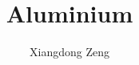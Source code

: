 \documentclass{beamer}
\title{Aluminium}
\author{Xiangdong Zeng}
\date{}
\begin{document}
\maketitle

\begin{frame}
\lipsum[1-2]
\end{frame}
\end{document}
